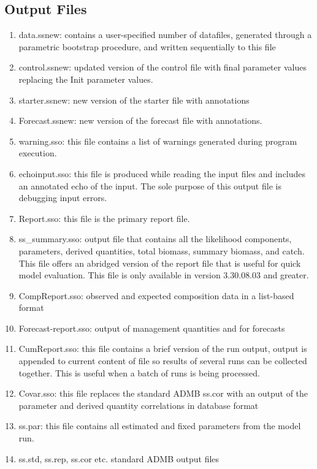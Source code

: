 	\subsection{Output Files}
	\begin{enumerate}
		\item data.ss\textunderscore new:  contains a user-specified number of datafiles, generated through a parametric bootstrap procedure, and written sequentially to this file
		\item control.ss\textunderscore new:  updated version of the control file with final parameter values replacing the Init parameter values.
		\item starter.ss\textunderscore new:  new version of the starter file with annotations
		\item Forecast.ss\textunderscore new:  new version of the forecast file with annotations.
		\item warning.sso:  this file contains a list of warnings generated during program execution.
		\item echoinput.sso:  this file is produced while reading the input files and includes an annotated echo of the input.  The sole purpose of this output file is debugging input errors.
		\item Report.sso:  this file is the primary report file.
		\item ss\_summary.sso: output file that contains all the likelihood components, parameters, derived quantities, total biomass, summary biomass, and catch. This file offers an abridged version of the report file that is useful for quick model evaluation. This file is only available in version 3.30.08.03 and greater.
		\item CompReport.sso:  observed and expected composition data in a list-based format
		\item Forecast-report.sso:  output of management quantities and for forecasts
		\item CumReport.sso:  this file contains a brief version of the run output, output is appended to current content of file so results of several runs can be collected together.  This is useful when a batch of runs is being processed.
		\item Covar.sso:  this file replaces the standard ADMB ss.cor with an output of the parameter and derived quantity correlations in database format
		\item ss.par: this file contains all estimated and fixed parameters from the model run. 
		\item ss.std, ss.rep, ss.cor etc.  standard ADMB output files

\end{enumerate}
